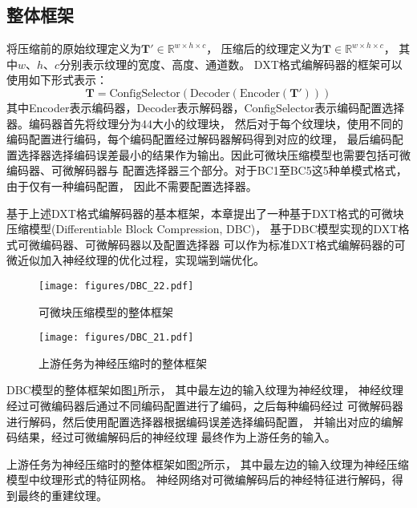 \subsection{整体框架}

将压缩前的原始纹理定义为$\mathbf{T}'\in \mathbb{R}^{w\times h\times c}$，
压缩后的纹理定义为$\mathbf{T}\in \mathbb{R}^{w\times h\times c}$，
其中$w$、$h$、$c$分别表示纹理的宽度、高度、通道数。
DXT格式编解码器的框架可以使用如下形式表示：
\begin{equation}
    \mathbf{T}=\text{ConfigSelector}(\text{Decoder}(\text{Encoder}(\mathbf{T}')))
\end{equation}
其中Encoder表示编码器，Decoder表示解码器，ConfigSelector表示编码配置选择器。编码器首先将纹理分为4\times4大小的纹理块，
然后对于每个纹理块，使用不同的编码配置进行编码，每个编码配置经过解码器解码得到对应的纹理，
最后编码配置选择器选择编码误差最小的结果作为输出。因此可微块压缩模型也需要包括可微编码器、可微解码器与
配置选择器三个部分。对于BC1至BC5这5种单模式格式，由于仅有一种编码配置，
因此不需要配置选择器。

基于上述DXT格式编解码器的基本框架，本章提出了一种基于DXT格式的可微块压缩模型(Differentiable Block Compression, DBC)， 
基于DBC模型实现的DXT格式可微编码器、可微解码器以及配置选择器
可以作为标准DXT格式编解码器的可微近似加入神经纹理的优化过程，实现端到端优化。

\begin{figure}[htbp]
    \centering
    \texttt{[image: figures/DBC\_22.pdf]}
    \caption{可微块压缩模型的整体框架}
    \label{fig:DBC_overview}
\end{figure}

\begin{figure}[htbp]
    \centering
    \texttt{[image: figures/DBC\_21.pdf]}
    \caption{上游任务为神经压缩时的整体框架}
    \label{fig:DBC_nm}
\end{figure}

DBC模型的整体框架如图\ref{fig:DBC_overview}所示，
其中最左边的输入纹理为神经纹理，
神经纹理经过可微编码器后通过不同编码配置进行了编码，之后每种编码经过
可微解码器进行解码，然后使用配置选择器根据编码误差选择编码配置，
并输出对应的编解码结果，经过可微编解码后的神经纹理
最终作为上游任务的输入。

上游任务为神经压缩时的整体框架如图\ref{fig:DBC_nm}所示，
其中最左边的输入纹理为神经压缩模型中纹理形式的特征网格。
神经网络对可微编解码后的神经特征进行解码，得到最终的重建纹理。

